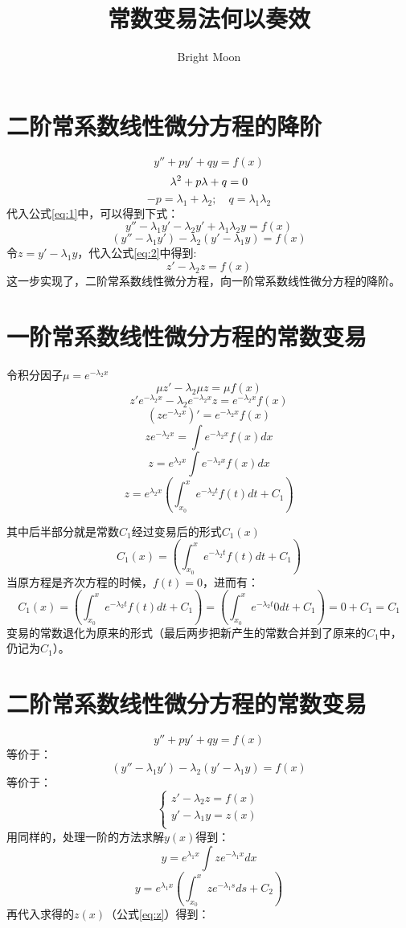 \documentclass[UTF8]{ctexart}
\title{常数变易法何以奏效}
\author{Bright Moon}
\begin{document}
\maketitle



\section{二阶常系数线性微分方程的降阶}
\begin{equation}\label{eq:1}
    y''+py'+qy=f(x)
\end{equation}
\[\lambda ^2 +p\lambda+q=0\\\]
\[-p=\lambda_1+\lambda_2;\quad q=\lambda_1\lambda_2\]
代入公式\ref{eq:1}中，可以得到下式：
\[y''-\lambda _1y'-\lambda _2y'+\lambda _1 \lambda _2y=f(x)\]
\begin{equation}\label{eq:2}
(y''-\lambda _1y')-\lambda _2(y'-\lambda _1y)=f(x)
\end{equation}
令$z=y'-\lambda _1y$，代入公式\ref{eq:2}中得到:
\begin{equation}\label{eq:3}
z'-\lambda _2z=f(x)
\end{equation}
这一步实现了，二阶常系数线性微分方程，向一阶常系数线性微分方程的降阶。
\section{一阶常系数线性微分方程的常数变易}
令积分因子$\mu=e^{-\lambda _2x}$
\[\mu z'-\lambda _2 \mu z = \mu f(x)\]
\[z'e^{-\lambda _2x}-\lambda _2e^{-\lambda _2x}z=e^{-\lambda _2x}f(x)\]
\[(ze^{-\lambda _2x})'=e^{-\lambda _2x}f(x)\]
\[ze^{-\lambda _2x} = \int e^{-\lambda _2x}f(x)dx\]
\[z =e^{\lambda _2x} \int e^{-\lambda _2x}f(x)dx\]
\begin{equation}\label{eq:z}
    z =e^{\lambda _2x}\left ( \int _{x_0} ^x e^{-\lambda _2t}f(t)dt+C_1\right )
\end{equation}

其中后半部分就是常数$C_1$经过变易后的形式$C_1(x)$
\[C_1(x)=\left ( \int _{x_0} ^x e^{-\lambda _2t}f(t)dt+C_1\right )\]
当原方程是齐次方程的时候，$f(t)=0$，进而有：
\[C_1(x)=\left ( \int _{x_0} ^x e^{-\lambda _2t}f(t)dt+C_1\right )=\left ( \int _{x_0} ^x e^{-\lambda _2t}0dt+C_1\right )=0+ C_1=C_1\]
变易的常数退化为原来的形式（最后两步把新产生的常数合并到了原来的$C_1$中，仍记为$C_1$）。
\section{二阶常系数线性微分方程的常数变易}
\[y''+py'+qy=f(x)\]
等价于：
\[(y''-\lambda _1y')-\lambda _2(y'-\lambda _1y)=f(x)\]
等价于：
\[\begin{cases}
z'-\lambda _2z=f(x)\\
y'-\lambda _1y=z(x)\\
\end{cases}\]
用同样的，处理一阶的方法求解$y(x)$得到：
\[y = e^{\lambda _1 x}\int z e^{-\lambda _1 x}dx\]
\[y = e^{\lambda _1 x}\left (\int_{x_0}^{x} z e^{-\lambda _1 s}ds+C_2\right )\]
再代入求得的$z(x)$（公式\ref{eq:z}）得到：
\end{document}
